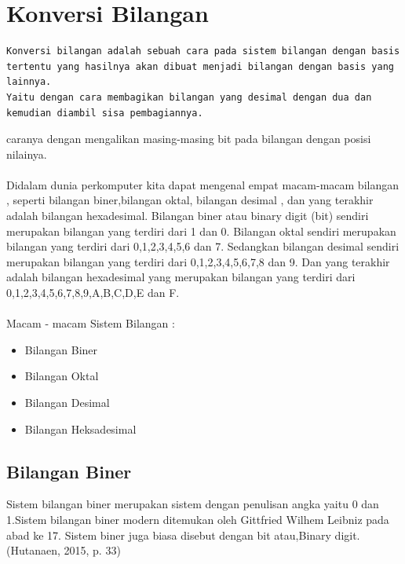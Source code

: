 ﻿%
\section{Konversi Bilangan}
\begin{verbatim}
Konversi bilangan adalah sebuah cara pada sistem bilangan dengan basis tertentu yang hasilnya akan dibuat menjadi bilangan dengan basis yang lainnya. 
Yaitu dengan cara membagikan bilangan yang desimal dengan dua dan kemudian diambil sisa pembagiannya.
\end{verbatim}
caranya dengan mengalikan masing-masing bit pada bilangan dengan posisi nilainya.
\\\\Didalam dunia perkomputer kita dapat mengenal empat macam-macam bilangan , seperti bilangan biner,bilangan oktal, bilangan desimal , dan yang terakhir adalah bilangan hexadesimal. Bilangan biner atau binary digit (bit) sendiri merupakan bilangan yang terdiri dari 1 dan 0. Bilangan oktal sendiri merupakan bilangan yang terdiri dari 0,1,2,3,4,5,6 dan 7.
Sedangkan bilangan desimal sendiri merupakan bilangan yang terdiri dari 0,1,2,3,4,5,6,7,8 dan 9. Dan yang terakhir adalah bilangan hexadesimal yang merupakan bilangan yang terdiri dari 0,1,2,3,4,5,6,7,8,9,A,B,C,D,E dan F.
\\\\Macam - macam Sistem Bilangan :
\begin{itemize}
\item Bilangan Biner
\item Bilangan Oktal
\item Bilangan Desimal
\item Bilangan Heksadesimal
\end{itemize}

\subsection{Bilangan Biner}
\cite{hutahaean2015konsep} Sistem bilangan biner merupakan sistem dengan penulisan angka yaitu 0 dan 1.Sistem bilangan biner modern ditemukan oleh Gittfried Wilhem Leibniz pada abad ke 17. Sistem biner juga biasa disebut dengan bit atau,Binary digit. (Hutanaen, 2015, p. 33)
